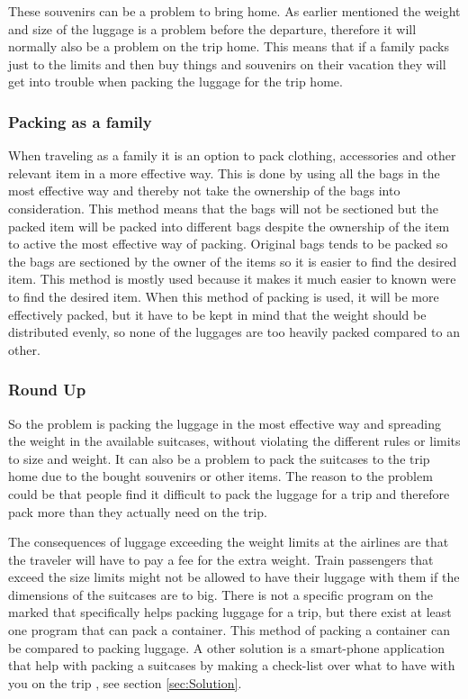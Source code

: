 These souvenirs can be a problem to bring home. As earlier mentioned the weight and size of the luggage is a problem before the departure, therefore it will normally also be a problem on the trip home.
This means that if a family packs just to the limits and then buy things and souvenirs on their vacation they will get into trouble when packing the luggage for the trip home.

\subsubsection{Packing as a family}
When traveling as a family it is an option to pack clothing, accessories and other relevant item in a more effective way. This is done by using all the bags in the most effective way and thereby not take the ownership of the bags into consideration. This method means that the bags will not be sectioned but the packed item will be packed into different bags despite the ownership of the item to active the most effective way of packing. Original bags tends to be packed so the bags are sectioned by the owner of the items so it is easier to find the desired item. This method is mostly used because it makes it much easier to known were to find the desired item. When this method of packing is used, it will be more effectively packed, but it have to be kept in mind that the weight should be distributed evenly, so none of the luggages are too heavily packed compared to an other.

\subsubsection{Round Up}
So the problem is packing the luggage in the most effective way and spreading the weight in the available suitcases, without violating the different rules or limits to size and weight. It can also be a problem to pack the suitcases to the trip home due to the bought souvenirs or other items. The reason to the problem could be that people find it difficult to pack the luggage for a trip and therefore pack more than they actually need on the trip.

The consequences of luggage exceeding the weight limits at the airlines are that the traveler will have to pay a fee for the extra weight.
Train passengers that exceed the size limits might not be allowed to have their luggage with them if the dimensions of the suitcases are to big.
There is not a specific program on the marked that specifically helps packing luggage for a trip, but there exist at least one program that can pack a container\citep{solvingmaze}. This method of packing a container can be compared to packing luggage. A other solution is a smart-phone application that help with packing a suitcases by making a check-list over what to have with you on the trip \citep{packingpro}, see section \ref{sec:Solution}.